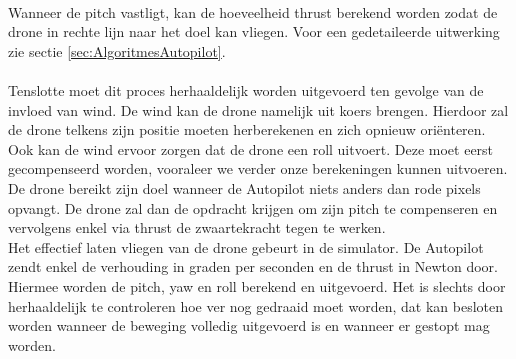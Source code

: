 \\
Wanneer de pitch vastligt, kan de hoeveelheid thrust berekend worden zodat de drone in rechte lijn naar het doel kan vliegen. Voor een gedetaileerde uitwerking zie sectie \ref{sec:AlgoritmesAutopilot}.
\\
\\
Tenslotte moet dit proces herhaaldelijk worden uitgevoerd ten gevolge van de invloed van wind. De wind kan de drone namelijk uit koers brengen. Hierdoor zal de drone telkens zijn positie moeten herberekenen en zich opnieuw ori\"enteren. Ook kan de wind ervoor zorgen dat de drone een roll uitvoert. Deze moet eerst gecompenseerd worden, vooraleer we verder onze berekeningen kunnen uitvoeren.
\\
De drone bereikt zijn doel wanneer de Autopilot niets anders dan rode pixels opvangt. De drone zal dan de opdracht krijgen om zijn pitch te compenseren en vervolgens enkel via thrust de zwaartekracht tegen te werken.
\\
Het effectief laten vliegen van de drone gebeurt in de simulator. De Autopilot zendt enkel de verhouding in graden per seconden en de thrust in Newton door. Hiermee worden de pitch, yaw en roll berekend en uitgevoerd. Het is slechts door herhaaldelijk te controleren hoe ver nog gedraaid moet worden, dat kan besloten worden wanneer de beweging volledig uitgevoerd is en wanneer er gestopt mag worden.